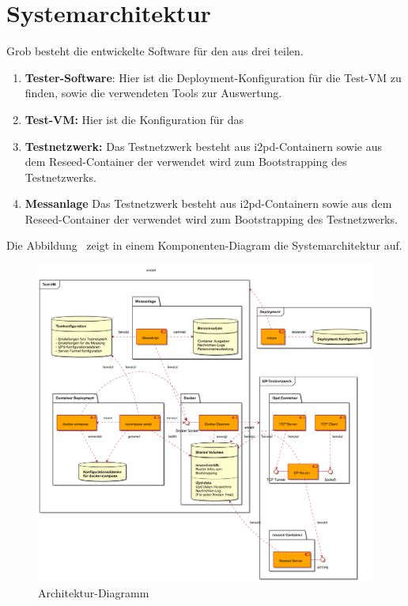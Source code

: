 \section{Systemarchitektur}

Grob besteht die entwickelte Software für den aus drei teilen.

\begin{enumerate}
    \item \textbf{Tester-Software}: Hier ist die Deployment-Konfiguration für die Test-VM zu finden, sowie die verwendeten Tools zur Auswertung.
    \item \textbf{Test-VM:} Hier ist die Konfiguration für das 
    \item \textbf{Testnetzwerk:} Das Testnetzwerk besteht aus i2pd-Containern sowie aus dem Reseed-Container der verwendet wird zum Bootstrapping des Testnetzwerks.
    \item \textbf{Messanlage} Das Testnetzwerk besteht aus i2pd-Containern sowie aus dem Reseed-Container der verwendet wird zum Bootstrapping des Testnetzwerks.
\end{enumerate}

Die Abbildung~ zeigt in einem Komponenten-Diagram die Systemarchitektur auf.


\begin{landscape}%
\begin{figure}[ht]
  \includegraphics[height=0.85\textwidth]{include/uml/componentDiagram.png}
  \caption{Architektur-Diagramm}\label{fig:architektur-diagramm}
\end{figure}
\end{landscape}%


